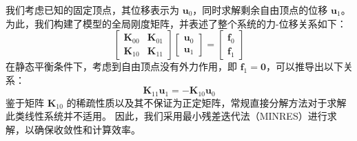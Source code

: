 我们考虑已知的固定顶点，其位移表示为 $\bm{u}_0$，同时求解剩余自由顶点的位移 $\bm{u}_1$。
为此，我们构建了模型的全局刚度矩阵，并表述了整个系统的力-位移关系如下：
\begin{equation}
  \begin{bmatrix}
    \bm{K}_{00} & \bm{K}_{01} \\
    \bm{K}_{10} & \bm{K}_{11}
  \end{bmatrix}
  \begin{bmatrix}
    \bm{u}_0 \\
    \bm{u}_1
  \end{bmatrix}
  =
  \begin{bmatrix}
    \bm{f}_0 \\
    \bm{f}_1
  \end{bmatrix}
\end{equation}
在静态平衡条件下，考虑到自由顶点没有外力作用，即 $\bm{f}_1 = \bm{0}$，可以推导出以下关系：
\begin{equation} \label{eq:mtm-solve}
  \bm{K}_{11} \bm{u}_1 = - \bm{K}_{10} \bm{u}_0
\end{equation}
鉴于矩阵 $\bm{K}_{10}$ 的稀疏性质以及其不保证为正定矩阵，常规直接分解方法对于求解此类线性系统并不适用。
因此，我们采用最小残差迭代法（MINRES）进行求解，以确保收敛性和计算效率。
